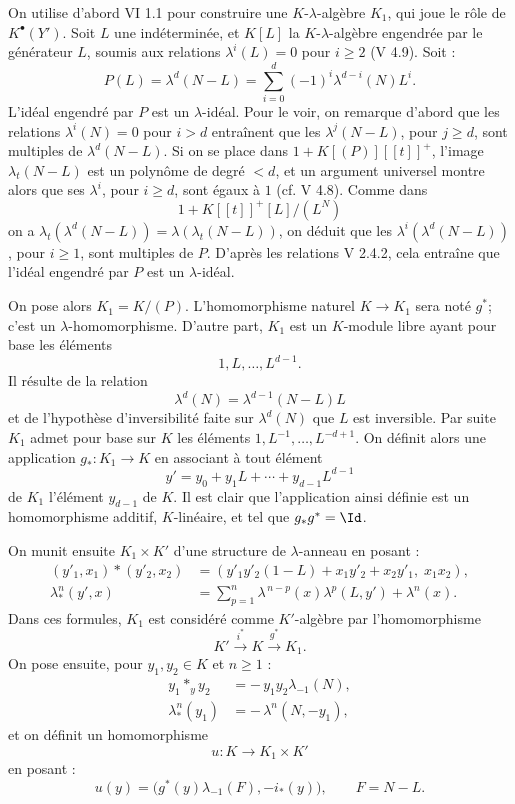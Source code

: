 \documentclass[11pt]{article}
\begin{document}
On utilise d'abord VI 1.1 pour construire une \(K\)-\(\lambda\)-algèbre \(K_1\), qui joue le rôle de \(K^\bullet(Y')\). Soit \(L\) une indéterminée, et \(K[L]\) la \(K\)-\(\lambda\)-algèbre engendrée par le générateur \(L\), soumis aux relations \(\lambda^i(L)=0\) pour \(i\ge2\) (V 4.9). Soit :
\[
  P(L)=\lambda^d(N-L)=\sum_{i=0}^{d}(-1)^i\lambda^{d-i}(N)L^i.
\]
L'idéal engendré par \(P\) est un \(\lambda\)-idéal. Pour le voir, on remarque d'abord que les relations \(\lambda^i(N)=0\) pour \(i>d\) entraînent que les \(\lambda^j(N-L)\), pour \(j\ge d\), sont multiples de \(\lambda^d(N-L)\). Si on se place dans \(1+K[(P)][[t]]^+\), l'image \(\lambda_t(N-L)\) est un polynôme de degré \(<d\), et un argument universel montre alors que ses \(\lambda^i\), pour \(i\ge d\), sont égaux à \(1\) (cf. V 4.8). Comme dans
\[
1+K[[t]]^+[L]/(L^N)
\]
on a \(\lambda_t(\lambda^d(N-L))=\lambda(\lambda_t(N-L))\), on déduit que les \(\lambda^i(\lambda^d(N-L))\), pour \(i\ge1\), sont multiples de \(P\). D'après les relations V 2.4.2, cela entraîne que l'idéal engendré par \(P\) est un \(\lambda\)-idéal.

On pose alors \(K_1=K/(P)\). L'homomorphisme naturel \(K\to K_1\) sera noté \(g^*\); c'est un \(\lambda\)-homomorphisme. D'autre part, \(K_1\) est un \(K\)-module libre ayant pour base les éléments
\[
  1,L,\ldots,L^{d-1}.
\]
Il résulte de la relation
\[
  \lambda^d(N)=\lambda^{d-1}(N-L)L
\]
et de l'hypothèse d'inversibilité faite sur \(\lambda^d(N)\) que \(L\) est inversible. Par suite \(K_1\) admet pour base sur \(K\) les éléments \(1,L^{-1},\ldots,L^{-d+1}\). On définit alors une application \(g_*:K_1\to K\) en associant à tout élément
\[
y'=y_0+y_1L+\cdots+y_{d-1}L^{d-1}
\]
de \(K_1\) l'élément \(y_{d-1}\) de \(K\). Il est clair que l'application ainsi définie est un homomorphisme additif, \(K\)-linéaire, et tel que \(g_*g^*=\Id\).

On munit ensuite \(K_1\times K'\) d'une structure de \(\lambda\)-anneau en posant :
\begin{align}
 (y'_1,x_1)*(y'_2,x_2)
   &=(y'_1y'_2(1-L)+x_1y'_2+x_2y'_1,\; x_1x_2), \tag{4.7.1}\\
 \lambda^n_*(y',x)
   &=\sum_{p=1}^{n}\lambda^{\,n-p}(x)\lambda^p(L,y')
     +\lambda^n(x). \tag{4.7.2}
\end{align}
Dans ces formules, \(K_1\) est considéré comme \(K'\)-algèbre par l'homomorphisme
\[
  K'\xrightarrow{i^*}K\xrightarrow{g^*}K_1.
\]
On pose ensuite, pour \(y_1,y_2\in K\) et \(n\ge1\) :
\begin{align}
 y_1*_y y_2&=-\,y_1y_2\lambda_{-1}(N), \tag{4.7.3}\\
 \lambda^n_*(y_1)&=-\,\lambda^n(N,-y_1), \tag{4.7.4}
\end{align}
et on définit un homomorphisme
\[
  u:K\longrightarrow K_1\times K'
\]
en posant :
\[
  u(y)=\bigl(g^*(y)\lambda_{-1}(F),-i_*(y)\bigr),
  \qquad F=N-L.
\]
\end{document}
